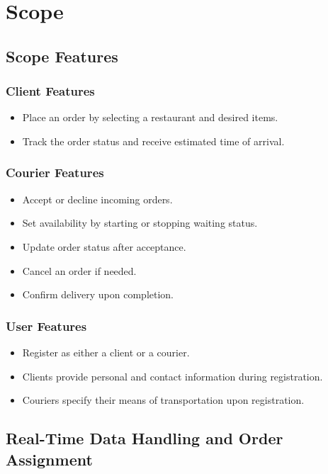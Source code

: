 \section{Scope}

\subsection{Scope Features}  

\subsubsection{Client Features}  
\begin{itemize}
    \item Place an order by selecting a restaurant and desired items.
    \item Track the order status and receive estimated time of arrival.
\end{itemize}

\subsubsection{Courier Features}  
\begin{itemize}
    \item Accept or decline incoming orders.
    \item Set availability by starting or stopping waiting status.
    \item Update order status after acceptance.
    \item Cancel an order if needed.
    \item Confirm delivery upon completion.
\end{itemize}

\subsubsection{User Features}  
\begin{itemize}
    \item Register as either a client or a courier.
    \item Clients provide personal and contact information during registration.
    \item Couriers specify their means of transportation upon registration.
\end{itemize}
  

\subsection{Real-Time Data Handling and Order Assignment}  

